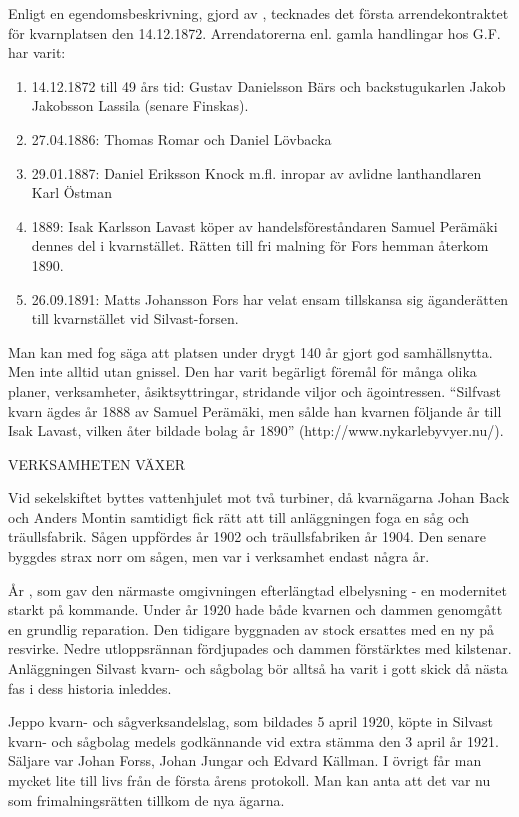 Enligt en egendomsbeskrivning, gjord av , tecknades det första arrendekontraktet för kvarnplatsen den 14.12.1872. Arrendatorerna enl. gamla handlingar hos G.F. har varit:
\begin{enumerate}
  \item 14.12.1872 till 49 års tid: Gustav Danielsson Bärs och backstugukarlen Jakob Jakobsson Lassila (senare Finskas).
  \item 27.04.1886: Thomas Romar och Daniel Lövbacka
  \item 29.01.1887: Daniel Eriksson Knock m.fl. inropar av avlidne lanthandlaren Karl Östman
  \item 1889: Isak Karlsson Lavast köper av handelsföreståndaren Samuel Perämäki dennes del i kvarnstället. Rätten till fri malning för Fors hemman återkom 1890.
  \item 26.09.1891: Matts Johansson Fors har velat ensam tillskansa sig äganderätten till kvarnstället vid Silvast-forsen.
\end{enumerate}
Man kan med fog säga att platsen under drygt 140 år gjort god samhällsnytta. Men inte alltid utan gnissel. Den har varit begärligt föremål för många olika planer, verksamheter, åsiktsyttringar, stridande viljor och ägointressen. ``Silfvast kvarn ägdes år 1888 av Samuel Perämäki, men sålde han kvarnen följande år till Isak Lavast, vilken åter bildade bolag år 1890'' (http://www.nykarlebyvyer.nu/).


VERKSAMHETEN VÄXER

Vid sekelskiftet byttes vattenhjulet mot två turbiner, då kvarnägarna Johan Back och Anders Montin samtidigt fick rätt att till anläggningen foga en såg och träullsfabrik. Sågen uppfördes år 1902 och träullsfabriken år 1904. Den senare byggdes strax norr om sågen, men var i verksamhet endast några år.

År , som gav den närmaste omgivningen efterlängtad elbelysning - en modernitet starkt på kommande. Under år 1920 hade både kvarnen och dammen genomgått en grundlig reparation. Den tidigare byggnaden av stock ersattes med en ny på resvirke. Nedre utloppsrännan fördjupades och dammen förstärktes med kilstenar. Anläggningen Silvast kvarn- och sågbolag bör alltså ha varit i gott skick då nästa fas i dess historia inleddes.

Jeppo kvarn- och sågverksandelslag, som bildades 5 april 1920,  köpte in Silvast kvarn- och sågbolag medels godkännande vid extra stämma den 3 april år 1921. Säljare var Johan Forss, Johan Jungar och Edvard Källman. I övrigt får man mycket lite till livs från de första årens protokoll. Man kan anta att det var nu som frimalningsrätten tillkom de nya ägarna.

